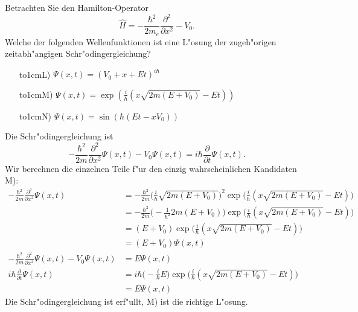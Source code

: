 Betrachten Sie den Hamilton-Operator
\[
\hat H=-\frac{\hbar^2}{2m_e}\frac{\partial^2}{\partial x^2}-V_0.
\]
Welche der folgenden Wellenfunktionen ist eine L"osung der zugeh"origen
zeitabh"angigen Schr"odingergleichung?
\begin{itemize}
\item[\hbox to1cm{L)\hfill}]
$
\Psi(x,t)
=
(V_0+x+Et)^{i\hbar}
$
\item[\hbox to1cm{M)\hfill}]
$
\Psi(x,t)
=
\exp\left(\frac{i}{\hbar}(x\sqrt{2m(E+V_0)}-Et)\right)
$
\item[\hbox to1cm{N)\hfill}]
$
\Psi(x,t)
=
\sin(\hbar (Et-xV_0))
$
\end{itemize}

\begin{loesung}
Die Schr"odingergleichung ist 
\[
-\frac{\hbar^2}{2m}\frac{\partial^2}{\partial x^2}\Psi(x,t)-V_0\Psi(x,t)=i\hbar\frac{\partial}{\partial t}\Psi(x,t).
\]
Wir berechnen die einzelnen Teile f"ur den einzig wahrscheinlichen
Kandidaten M):
\begin{align*}
-\frac{\hbar^2}{2m}
\frac{\partial^2}{\partial x^2}
\Psi(x,t)
&=
-\frac{\hbar^2}{2m}
\biggl(\frac{i}{\hbar}\sqrt{2m(E+V_0)}\biggr)^2
\exp\biggl(\frac{i}{\hbar}(x\sqrt{2m(E+V_0)}-Et)\biggr)
\\
&=
-\frac{\hbar^2}{2m}
\biggl(-\frac{1}{\hbar^2}2m(E+V_0)\biggr)
\exp\biggl(\frac{i}{\hbar}(x\sqrt{2m(E+V_0)}-Et)\biggr)
\\
&=
(E+V_0)
\exp\biggl(\frac{i}{\hbar}(x\sqrt{2m(E+V_0)}-Et)\biggr)
\\
&=(E+V_0)\Psi(x,t)
\\
-\frac{\hbar^2}{2m}
\frac{\partial^2}{\partial x^2}
\Psi(x,t)
-V_0\Psi(x,t)
&=
E\Psi(x,t)
\\
i\hbar
\frac{\partial}{\partial t} \Psi(x,t)
&=
i\hbar
\biggl(-\frac{i}{\hbar}E\biggr)
\exp\biggl(\frac{i}{\hbar}(x\sqrt{2m(E+V_0)}-Et)\biggr)
\\
&=
E\Psi(x,t)
\end{align*}
Die Schr"odingergleichung ist erf"ullt, M) ist die richtige L"osung.
\end{loesung}

